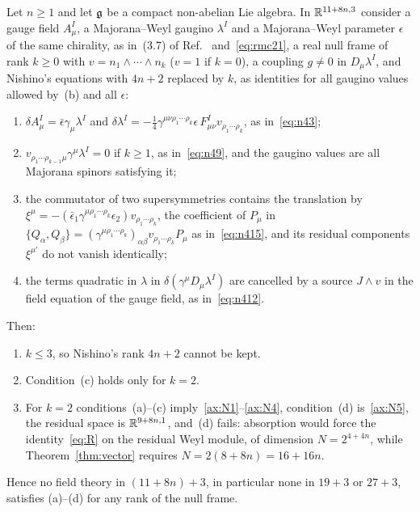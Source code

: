 \begin{proposition}
\label{prop:transfer}
Let $n\ge1$ and let $\mathfrak{g}$ be a compact non-abelian Lie algebra. In $\mathbb{R}^{11+8n,3}$ consider a gauge field $A^I_\mu$, a Majorana--Weyl gaugino $\lambda^I$ and a Majorana--Weyl parameter $\epsilon$ of the same chirality, as in~(3.7) of Ref.~\cite{RiosMarraniChester2019} and~\eqref{eq:rmc21}, a real null frame of rank $k\ge0$ with $v=n_1\wedge\cdots\wedge n_k$ ($v=1$ if $k=0$), a coupling $g\ne0$ in $D_\mu\lambda^I$, and Nishino's equations with $4n+2$ replaced by $k$, as identities for all gaugino values allowed by~(b) and all $\epsilon$:
\begin{enumerate}[label=(\alph*)]
\item $\delta A^I_\mu=\bar\epsilon\gamma_\mu\lambda^I$ and $\delta\lambda^I=-\frac14\gamma^{\mu\nu\rho_1\cdots\rho_k}\epsilon\,F^I_{\mu\nu}v_{\rho_1\cdots\rho_k}$, as in~\eqref{eq:n43};
\item $v_{\rho_1\cdots\rho_{k-1}\mu}\gamma^\mu\lambda^I=0$ if $k\ge1$, as in~\eqref{eq:n49}, and the gaugino values are all Majorana spinors satisfying it;
\item the commutator of two supersymmetries contains the translation by $\xi^\mu=-(\bar\epsilon_1\gamma^{\mu\rho_1\cdots\rho_k}\epsilon_2)v_{\rho_1\cdots\rho_k}$, the coefficient of $P_\mu$ in $\{Q_\alpha,Q_\beta\}=(\gamma^{\mu\rho_1\cdots\rho_k})_{\alpha\beta}v_{\rho_1\cdots\rho_k}P_\mu$ as in~\eqref{eq:n415}, and its residual components $\xi^{\mu'}$ do not vanish identically;
\item the terms quadratic in $\lambda$ in $\delta(\gamma^\mu D_\mu\lambda^I)$ are cancelled by a source $J\wedge v$ in the field equation of the gauge field, as in~\eqref{eq:n412}.
\end{enumerate}
Then:
\begin{enumerate}[label=(\roman*)]
\item $k\le3$, so Nishino's rank $4n+2$ cannot be kept.
\item Condition~(c) holds only for $k=2$.
\item For $k=2$ conditions~(a)--(c) imply~\ref{ax:N1}--\ref{ax:N4}, condition~(d) is~\ref{ax:N5}, the residual space is $\mathbb{R}^{9+8n,1}$, and~(d) fails: absorption would force the identity~\eqref{eq:R} on the residual Weyl module, of dimension $N=2^{4+4n}$, while Theorem~\ref{thm:vector} requires $N=2(8+8n)=16+16n$.
\end{enumerate}
Hence no field theory in $(11+8n)+3$, in particular none in $19+3$ or $27+3$, satisfies (a)--(d) for any rank of the null frame.
\end{proposition}

